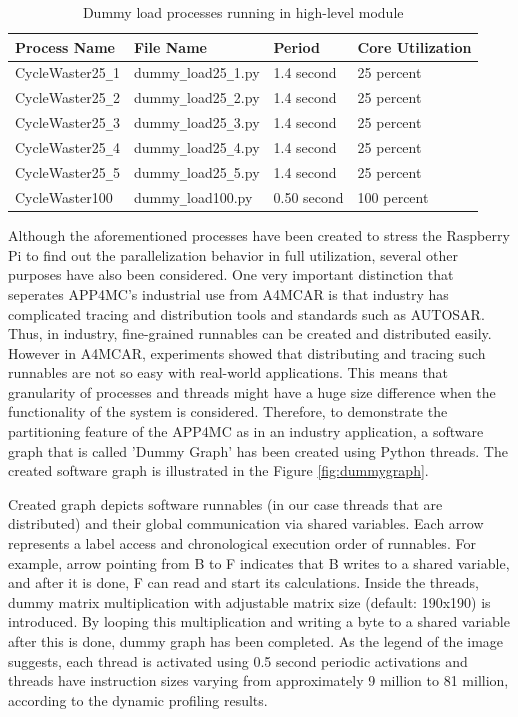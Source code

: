 \begin{itemize}
	\begin{table}[h!]
		\centering
		\begin{tabular}{|l|l|l|l|}
			\hline
			Process Name & File Name & Period & Core Utilization \\
			\hline
			\hline
			CycleWaster25\texttt{\_}1 & dummy\texttt{\_}load25\texttt{\_}1.py & 1.4 second & 25 percent \\
			\hline
			CycleWaster25\texttt{\_}2 & dummy\texttt{\_}load25\texttt{\_}2.py & 1.4 second &  25 percent \\
			\hline
			CycleWaster25\texttt{\_}3 & dummy\texttt{\_}load25\texttt{\_}3.py & 1.4 second &  25 percent \\
			\hline
			CycleWaster25\texttt{\_}4 & dummy\texttt{\_}load25\texttt{\_}4.py & 1.4 second &  25 percent \\
			\hline
			CycleWaster25\texttt{\_}5 & dummy\texttt{\_}load25\texttt{\_}5.py & 1.4 second &  25 percent \\
			\hline
			CycleWaster100 & dummy\texttt{\_}load100.py & 0.50 second & 100 percent \\
			\hline
		\end{tabular}
		\caption{Dummy load processes running in high-level module}
		\label{tbl_dummyloads}
	\end{table}
	
\end{itemize}

Although the aforementioned processes have been created to stress the Raspberry Pi to find out the parallelization behavior in full utilization, several other purposes have also been considered. One very important distinction that seperates APP4MC's industrial use from A4MCAR is that industry has complicated tracing and distribution tools and standards such as AUTOSAR. Thus, in industry, fine-grained runnables can be created and distributed easily. However in A4MCAR, experiments showed that distributing and tracing such runnables are not so easy with real-world applications. This means that granularity of processes and threads might have a huge size difference when the functionality of the system is considered. Therefore, to demonstrate the partitioning feature of the APP4MC as in an industry application, a software graph that is called 'Dummy Graph' has been created using Python threads. The created software graph is illustrated in the Figure \ref{fig:dummygraph}.

Created graph depicts software runnables (in our case threads that are distributed) and their global communication via shared variables. Each arrow represents a label access and chronological execution order of runnables. For example, arrow pointing from B to F indicates that B writes to a shared variable, and after it is done, F can read and start its calculations. Inside the threads, dummy matrix multiplication with adjustable matrix size (default: 190x190) is introduced. By looping this multiplication and writing a byte to a shared variable after this is done, dummy graph has been completed. As the legend of the image suggests, each thread is activated using 0.5 second periodic activations and threads have instruction sizes varying from approximately 9 million to 81 million, according to the dynamic profiling results. 

